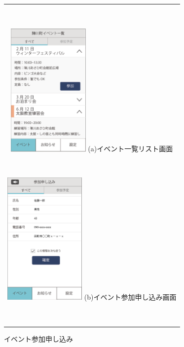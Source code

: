 \begin{figure}[htbp]
  \begin{center}
    \begin{tabular}{c}
​
      \begin{minipage}{0.33\hsize}
        \begin{center}
\includegraphics[width=4cm]{event_list_town.png}
          \hspace{1cm} %
          {\footnotesize (a)イベント一覧リスト画面}
        \end{center}
      \end{minipage}
​
      \begin{minipage}{0.33\hsize}
        \begin{center}
\includegraphics[width=4cm]{participant_form}
          \hspace{1cm}%
          {\footnotesize (b)イベント参加申し込み画面}
        \end{center}
      \end{minipage}
​
    \end{tabular}
    \caption{イベント参加申し込み}
    \label{fig:lena}
  \end{center}
\end{figure}
​
